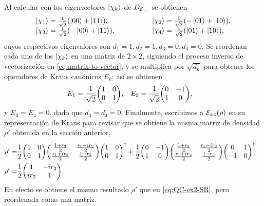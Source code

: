 Al calcular con los eigenvectores $\ket{\chi_k}$ de $D_{\mathcal{E}_{xz}}$ 
se obtienen
\begin{align}
\begin{tabular}{lcl}
$\ket{\chi_1}=\frac{1}{\sqrt{2}}\qty(\ket{00}+\ket{11})$, & \hspace{1cm}
& $ \ket{\chi_{2}}=\frac{1}{\sqrt{2}}\qty(-\ket{01}+\ket{10})$, \\
$\ket{\chi_{3}}=\frac{1}{\sqrt{2}}\qty(-\ket{00}+\ket{11})$, & \hspace{1cm}
& $\ket{\chi_4}=\frac{1}{\sqrt{2}}\qty(\ket{01}+\ket{10})$,
\end{tabular}
\end{align}
cuyos respectivos eigenvalores son $d_1=1,d_2=1,d_3=0,d_4=0$. 
Se reordenan cada uno de los $\ket{\chi_k}$ en una matriz
de $2\times2$, siguiendo el proceso inverso de vectorización
en \eqref{eq:matrix-to-vector}, y se multiplica por $\sqrt{d_k}$ 
para obtener los operadores de Kraus canónicos $E_k$; así se obtienen
\begin{align}
E_1&=
\frac{1}{\sqrt{2}}
\mqty(
1 & 0\\
0 & 1
),
&
E_2&=
\frac{1}{\sqrt{2}}
\mqty(
0 & -1\\
1 & 0
),
\end{align}
y $E_3=E_4=0$, dado que $d_3=d_4=0$. 
Finalmente, escribimos a $\mathcal{E}_{xz}\qty(\rho)$ en su representación 
de Kraus para revisar que se obtiene la misma matriz
de densidad $\rho'$ obtenida en la sección anterior,
\begin{align}
\rho'=&
\frac{1}{2}
\mqty(
1 & 0\\
0 & 1
)
\mqty(
\frac{1+r_3}{2}& \frac{r_1-ir_2}{2}\\
\frac{r_1+ir_2}{2} & \frac{1-r_3}{2}
)
\mqty(
1 & 0\\
0 & 1
)^{\dagger}
+
\frac{1}{2}
\mqty(
0 & -1\\
1 & 0
)
\mqty(
\frac{1+r_3}{2}& \frac{r_1-ir_2}{2}\\
\frac{r_1+ir_2}{2} & \frac{1-r_3}{2}
)
\mqty(
0 & 1\\
-1 & 0
)^{\dagger}&
\nonumber\\
\rho'=&
\frac{1}{2}
\mqty(
1 & -ir_2\\
ir_2 & 1
).
\label{eq:QC-ex2-KR}
\end{align}
En efecto se obtiene el mismo resultado $\rho'$ que 
en  \eqref{eq:QC-ex2-SR}, pero reordenada como una matriz. 


